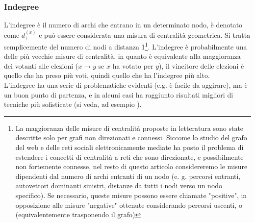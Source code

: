 \subsubsection{Indegree}
L'indegree è il numero di archi che entrano in un determinato nodo, è denotato come $d_+^{(x)}$ e può essere considerata una misura di centralità geometrica. Si tratta semplicemente del numero di nodi a distanza 1\footnote{La maggioranza delle misure di centralità proposte in letteratura sono state descritte solo per grafi non direzionati e connessi. Siccome lo studio del grafo del web e delle reti sociali elettronicamente mediate ha posto il problema di estendere i concetti di centralità a reti che sono direzionate, e possibilmente non fortemente connesse, nel resto di questo articolo considereremo le misure dipendenti dal numero di archi entranti di un nodo (e. g. percorsi entranti, autovettori dominanti sinistri, distanze da tutti i nodi verso un nodo specifico). Se necessario, queste misure possono essere chiamate "positive", in opposizione alle misure "negative" ottenute considerando percorsi uscenti, o (equivalentemente trasponendo il grafo)}. L'indegree è probabilmente una delle più vecchie misure di centralità, in quanto è equivalente alla maggioranza dei votanti alle elezioni ($x \rightarrow y$ se $x$ ha votato per $y$), il vincitore delle elezioni è quello che ha preso più voti, quindi quello che ha l'indegree più alto.\\
L'indegree ha una serie di problematiche evidenti (e.g. è facile da aggirare), ma è un buon punto di partenza, e in alcuni casi ha raggiunto risultati migliori di tecniche più sofisticate (si veda, ad esempio %
).
